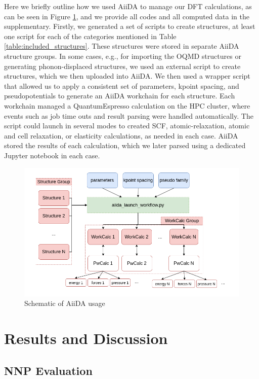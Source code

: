 \documentclass{article}
\begin{document}
Here we briefly outline how we used AiiDA to manage our DFT calculations, as can be seen in Figure \ref{fig:aiida_methods},
and we provide all codes and all computed data in the supplementary.
Firstly, we generated a set of scripts to create structures, at least one script for each of the categories mentioned in Table \ref{table:included_structures}.
These structures were stored in separate AiiDA structure groups.
In some cases, e.g., for importing the OQMD structures or generating phonon-displaced structures, we used an external script to create structures, which we then uploaded into AiiDA.
We then used a wrapper script that allowed us to apply a consistent set of parameters, kpoint spacing, and pseudopotentials to generate an AiiDA workchain for each structure.
Each workchain managed a QuantumEspresso calculation on the HPC cluster, 
where events such as job time outs and result parsing were handled automatically.
The script could launch in several modes to created SCF, atomic-relaxation, atomic and cell relaxation, or elasticity calculations, as needed in each case.
AiiDA stored the results of each calculation, which we later parsed using a dedicated Jupyter notebook in each case. 
\begin{figure}[H]%
\centering%
\includegraphics[width=1.0\textwidth,center]{figures/recalculateDBschematic.png}%
\caption{Schematic of AiiDA usage}%
\label{fig:aiida_methods}
\end{figure}

\section{Results and Discussion}
\subsection{NNP Evaluation}
\end{document}
